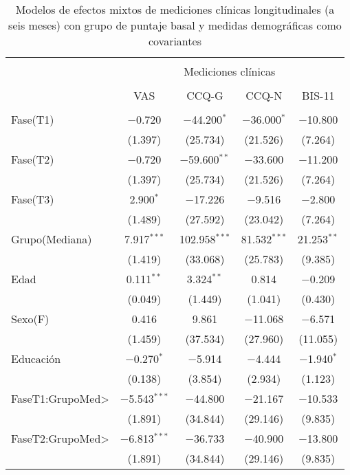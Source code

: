\begin{table}[!htbp] \centering
  \caption{Modelos de efectos mixtos de mediciones clínicas longitudinales (a seis meses) con grupo de puntaje basal y medidas demográficas como covariantes}
  \label{tab:clin3}
\begin{tabular}{@{\extracolsep{5pt}}lcccc}
\\[-1.8ex]\hline
\hline \\[-1.8ex]
 & \multicolumn{4}{c}{Mediciones clínicas } \\
\cline{2-5}
\\[-1.8ex] & VAS & CCQ-G & CCQ-N & BIS-11\\
\hline \\[-1.8ex]
  Fase(T1) & $-$0.720 & $-$44.200$^{*}$ & $-$36.000$^{*}$ & $-$10.800 \\
  & (1.397) & (25.734) & (21.526) & (7.264) \\
  Fase(T2) & $-$0.720 & $-$59.600$^{**}$ & $-$33.600 & $-$11.200 \\
  & (1.397) & (25.734) & (21.526) & (7.264) \\
  Fase(T3) & 2.900$^{*}$ & $-$17.226 & $-$9.516 & $-$2.800 \\
  & (1.489) & (27.592) & (23.042) & (7.264) \\
  Grupo(Mediana) & 7.917$^{***}$ & 102.958$^{***}$ & 81.532$^{***}$ & 21.253$^{**}$ \\
  & (1.419) & (33.068) & (25.783) & (9.385) \\
  Edad & 0.111$^{**}$ & 3.324$^{**}$ & 0.814 & $-$0.209 \\
  & (0.049) & (1.449) & (1.041) & (0.430) \\
  Sexo(F) & 0.416 & 9.861 & $-$11.068 & $-$6.571 \\
  & (1.459) & (37.534) & (27.960) & (11.055) \\
  Educación & $-$0.270$^{*}$ & $-$5.914 & $-$4.444 & $-$1.940$^{*}$ \\
  & (0.138) & (3.854) & (2.934) & (1.123) \\
  FaseT1:GrupoMed\textgreater  & $-$5.543$^{***}$ & $-$44.800 & $-$21.167 & $-$10.533 \\
  & (1.891) & (34.844) & (29.146) & (9.835) \\
  FaseT2:GrupoMed\textgreater  & $-$6.813$^{***}$ & $-$36.733 & $-$40.900 & $-$13.800 \\
  & (1.891) & (34.844) & (29.146) & (9.835) \\

\end{tabular}
\end{table}
